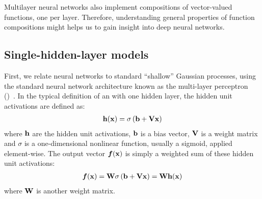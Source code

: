 \documentclass{article} %
\begin{document}
Multilayer neural networks also implement compositions of vector-valued functions, one per layer.
Therefore, understanding general properties of function compositions might helps us to gain insight into deep neural networks.


\subsection{Single-hidden-layer models}

First, we relate neural networks to standard ``shallow'' Gaussian processes, using the standard neural network architecture known as the multi-layer perceptron (\MLP{})~\citep{rosenblatt1962principles}.
In the typical definition of an \MLP{} with one hidden layer, the hidden unit activations are defined as:
%
\begin{align}
{\bf{h}}({\bf{x}}) = \sigma \left( {\bf{b}} + \mathbf{V} {\bf{x}} \right)
\end{align}
%
where ${\bf{h}}$ are the hidden unit activations, ${\bf{b}}$ is a bias vector, $\mathbf{V}$ is a weight matrix and $\sigma$ is a one-dimensional nonlinear function, usually a sigmoid, applied element-wise. The output vector $\boldsymbol{f}({\bf{x}})$ is simply a weighted sum of these hidden unit activations:
%
\begin{align}
\boldsymbol{f}({\bf{x}}) = \mathbf{W} \sigma \left( {\bf{b}} + \mathbf{V} {\bf{x}} \right)  = \mathbf{W} {\bf{h}}({\bf{x}})
\label{eq:one-layer-nn}
\end{align}
%
where $\mathbf{W}$ is another weight matrix.
\end{document}
